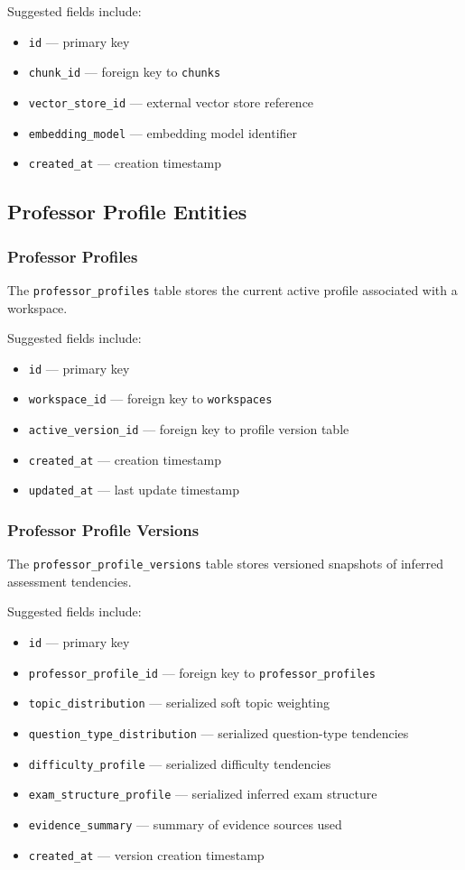 \documentclass[11pt]{article}
\begin{document}
Suggested fields include:
\begin{itemize}
\item \texttt{id} --- primary key
\item \texttt{chunk\_id} --- foreign key to \texttt{chunks}
\item \texttt{vector\_store\_id} --- external vector store reference
\item \texttt{embedding\_model} --- embedding model identifier
\item \texttt{created\_at} --- creation timestamp
\end{itemize}

\subsection{Professor Profile Entities}

\subsubsection{Professor Profiles}
The \texttt{professor\_profiles} table stores the current active profile associated with a workspace.

Suggested fields include:
\begin{itemize}
\item \texttt{id} --- primary key
\item \texttt{workspace\_id} --- foreign key to \texttt{workspaces}
\item \texttt{active\_version\_id} --- foreign key to profile version table
\item \texttt{created\_at} --- creation timestamp
\item \texttt{updated\_at} --- last update timestamp
\end{itemize}

\subsubsection{Professor Profile Versions}
The \texttt{professor\_profile\_versions} table stores versioned snapshots of inferred assessment tendencies.

Suggested fields include:
\begin{itemize}
\item \texttt{id} --- primary key
\item \texttt{professor\_profile\_id} --- foreign key to \texttt{professor\_profiles}
\item \texttt{topic\_distribution} --- serialized soft topic weighting
\item \texttt{question\_type\_distribution} --- serialized question-type tendencies
\item \texttt{difficulty\_profile} --- serialized difficulty tendencies
\item \texttt{exam\_structure\_profile} --- serialized inferred exam structure
\item \texttt{evidence\_summary} --- summary of evidence sources used
\item \texttt{created\_at} --- version creation timestamp
\end{itemize}
\end{document}
